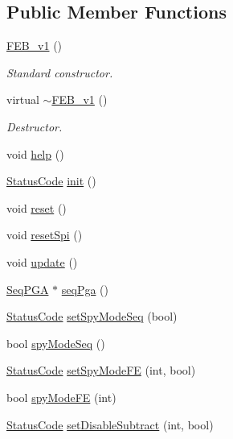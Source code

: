 \subsection*{Public Member Functions}
\begin{DoxyCompactItemize}
\item 
\hyperlink{classFEB__v1_aad65ff3d95f3f60583dad914f9c18a9d}{FEB\_\-v1} ()
\begin{DoxyCompactList}\small\item\em Standard constructor. \item\end{DoxyCompactList}\item 
virtual \hyperlink{classFEB__v1_a655c6fb31068c4dbb7fde34de77a5a49}{$\sim$FEB\_\-v1} ()
\begin{DoxyCompactList}\small\item\em Destructor. \item\end{DoxyCompactList}\item 
void \hyperlink{classFEB__v1_af93db546ad89ba7c2301fdc2314efd8a}{help} ()
\item 
\hyperlink{classStatusCode}{StatusCode} \hyperlink{classFEB__v1_a70d7d266c7d05fdfab21d5b0293f1ad8}{init} ()
\item 
void \hyperlink{classFEB__v1_a4e147b894ecbf4b05b92d01270d7ff13}{reset} ()
\item 
void \hyperlink{classFEB__v1_a1a50b5fff8a6e170fe136657f75b8ad4}{resetSpi} ()
\item 
void \hyperlink{classFEB__v1_a96ad348b7be37686998c0eaa7fd2e83e}{update} ()
\item 
\hyperlink{classSeqPGA}{SeqPGA} $\ast$ \hyperlink{classFEB__v1_a8bf655504f9b0c51d5aa5bc6b30da00d}{seqPga} ()
\item 
\hyperlink{classStatusCode}{StatusCode} \hyperlink{classFEB__v1_a9e13da349fc335ec44032fa0426c40d0}{setSpyModeSeq} (bool)
\item 
bool \hyperlink{classFEB__v1_a3ec8b74aedfbe5e3d3ce0d4b4eb44330}{spyModeSeq} ()
\item 
\hyperlink{classStatusCode}{StatusCode} \hyperlink{classFEB__v1_ab88d23abb96f746298e0fa1e1cf63e3e}{setSpyModeFE} (int, bool)
\item 
bool \hyperlink{classFEB__v1_a0b6d25515e575e370552c6b6f715fd76}{spyModeFE} (int)
\item 
\hyperlink{classStatusCode}{StatusCode} \hyperlink{classFEB__v1_a067a0aeae34dbd782547afbcd82fc77f}{setDisableSubtract} (int, bool)
\item 

\end{DoxyCompactItemize}
